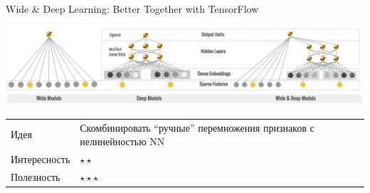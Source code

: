 \documentclass[11pt,aspectratio=169,handout]{beamer}
\begin{document}
\begin{frame}{Wide \& Deep Learning: Better Together with TensorFlow \cite{WD}}

\begin{center}
\includegraphics[scale=0.25]{images/widedeep.png}
\end{center}

\vfill
\begin{small}
\begin{tabular}{l l}
Идея & Скомбинировать ``ручные'' перемножения признаков с нелинейностью NN \\
Интересность & $\star\star$ \\
Полезность & $\star\star\star$
\end{tabular}
\end{small}

\end{frame}
\end{document}

